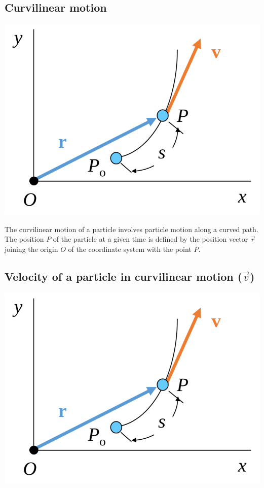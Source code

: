 \documentclass[11pt]{article}
\begin{document}
 \newpage
\subsection{Curvilinear motion}
\label{sec:org28f6fbf}
\begin{center}
\includegraphics[width=.9\linewidth]{./images/curvilinear-motion-of-particle.png}
\end{center}

The curvilinear motion of a particle involves particle motion along a curved path. The position \(P\) of the particle at a given time is defined by the position vector \(\vec{r}\) joining the origin \(O\) of the coordinate system with the point \(P\).
\subsection{Velocity of a particle in curvilinear motion (\(\vec{v}\))}
\label{sec:org4398d12}
\begin{center}
\includegraphics[width=.9\linewidth]{./images/curvilinear-motion-of-particle.png}
\end{center}
\end{document}
